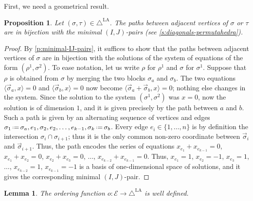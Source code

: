 \documentclass{amsart}
\newtheorem{proposition}[theorem]{Proposition}
\newtheorem{lemma}[theorem]{Lemma}
\theoremstyle{definition}
\newcommand{\eqdef}{\mbox{\,\raisebox{0.2ex}{\scriptsize\ensuremath{\mathrm:}}\ensuremath{=}\,}} %
\newcommand{\LAD}{\triangle^{\mathrm{LA}}}
\newcommand{\EC}{\mathcal{E}} %
\begin{document}
First, we need a geometrical result. 

\begin{proposition}
    \label{prop:geometrical-IJ}
    Let $(\sigma,\tau) \in \LAD$.
    The paths between adjacent vertices of $\sigma$ or $\tau$ are in bijection with the minimal $(I,J)$-pairs (see \cref{s:diagonals-permutahedra}).
\end{proposition}

\begin{proof}
    By \cref{p:minimal-IJ-pairs}, it suffices to show that the paths between adjacent vertices of $\sigma$ are in bijection with the solutions of the system of equations of the form $(\rho^1,\sigma^2)$. 
    To ease notation, let us write $\rho$ for $\rho^1$ and $\sigma$ for $\sigma^1$. 
    Suppose that $\rho$ is obtained from $\sigma$ by merging the two blocks $\sigma_a$ and $\sigma_b$. 
    The two equations $\langle \vec \sigma_a, x \rangle =0$ and $\langle \vec \sigma_b, x \rangle =0$ now become $\langle \vec \sigma_a + \vec \sigma_b, x \rangle =0$; nothing else changes in the system. 
    Since the solution to the system $(\sigma^1,\sigma^2)$ was $x=0$, now the solution is of dimension $1$, and it is given precisely by the path between $a$ and $b$.
    Such a path is given by an alternating sequence of vertices and edges $\sigma_1 \eqdef \sigma_a, e_1, \sigma_2, e_2, \ldots, e_{k-1}, \sigma_k \eqdef \sigma_b$. 
    Every edge $e_i \in \{1,\ldots, n\}$ is by definition the intersection $\sigma_{i} \cap \sigma_{i+1}$; thus it is the only common non-zero coordinate between $\vec \sigma_{i}$ and $\vec \sigma_{i+1}$.
    Thus, the path encodes the series of equations $x_{e_1}+x_{e_{k-1}}=0$, $x_{e_1}+x_{e_2}=0$, $x_{e_2}+x_{e_3}=0$, $\ldots$, $x_{e_{k-2}}+x_{e_{k-1}}=0$. 
    Thus, $x_{e_1}=1$, $x_{e_2}=-1$, $x_{e_3}=1$, $\ldots$, $x_{e_{k-2}}=1$, $x_{e_{k-1}}=-1$ is a basis of one-dimensional space of solutions, and it gives the corresponding minimal $(I,J)$-pair. 
\end{proof}

\begin{lemma} \label{l:o-well-defined}
The ordering function $o:\EC \to \LAD$ is well defined.
\end{lemma}
\end{document}
